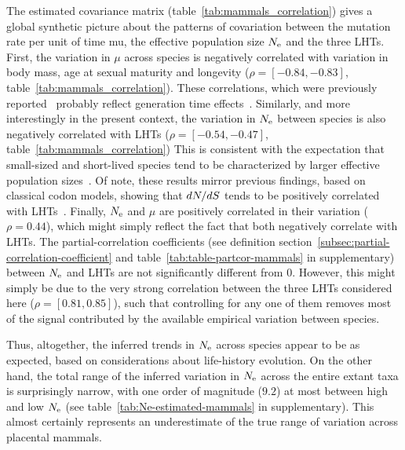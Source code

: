 The estimated covariance matrix (table~\ref{tab:mammals_correlation}) gives a global synthetic picture about the patterns of covariation between the mutation rate per unit of time mu, the \gls{effective population size} $N_{\text{e}}$ and the three \acrshort{LHT}s.
First, the variation in $\mu$ across species is negatively correlated with variation in body mass, age at sexual maturity and longevity ($\rho=[-0.84, -0.83]$, table~\ref{tab:mammals_correlation}).
These correlations, which were previously reported~\citep{Lartillot2012,Nabholz2013} probably reflect generation time effects~\citep{Amster2016}.
Similarly, and more interestingly in the present context, the variation in $N_{\text{e}}$ between species is also negatively correlated with \acrshort{LHT}s ($\rho=[-0.54, -0.47]$, table~\ref{tab:mammals_correlation})
This is consistent with the expectation that small-sized and short-lived species tend to be characterized by larger effective population sizes~\citep{Romiguier2014}.
Of note, these results mirror previous findings, based on classical \gls{codon} models, showing that $dN/dS$ tends to be positively correlated with \acrshort{LHT}s~\citep{Lartillot2012,Nabholz2013,Figuet2017}.
Finally, $N_{\text{e}}$ and $\mu$ are positively correlated in their variation ($\rho = 0.44$), which might simply reflect the fact that both negatively correlate with \acrshort{LHT}s.
The partial-correlation coefficients (see definition section~\ref{subsec:partial-correlation-coefficient} and table~\ref{tab:table-partcor-mammals} in supplementary) between $N_{\text{e}}$ and \acrshort{LHT}s are not significantly different from 0.
However, this might simply be due to the very strong correlation between the three \acrshort{LHT}s considered here ($\rho=[0.81, 0.85]$), such that controlling for any one of them removes most of the signal contributed by the available empirical variation between species.

Thus, altogether, the inferred trends in $N_{\text{e}}$ across species appear to be as expected, based on considerations about life-history evolution.
On the other hand, the total range of the inferred variation in $N_{\text{e}}$ across the entire extant taxa is surprisingly narrow, with one order of magnitude ($9.2$) at most between high and low $N_{\text{e}}$ (see table~\ref{tab:Ne-estimated-mammals} in supplementary).
This almost certainly represents an underestimate of the true range of variation across placental mammals.

